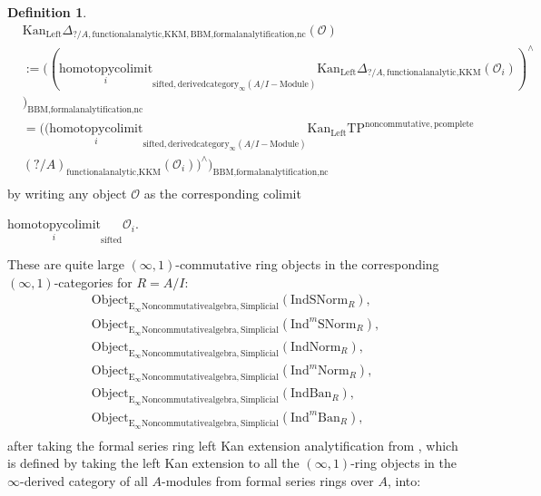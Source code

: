 \documentclass[11pt]{book}
\theoremstyle{definition}
\newtheorem{definition}[theorem]{Definition}
\numberwithin{equation}{section}
\begin{document}
\begin{definition}
\begin{align}
&\mathrm{Kan}_{\mathrm{Left}}\Delta_{?/A,\text{functionalanalytic,KKM},\text{BBM,formalanalytification,nc}}(\mathcal{O})\\
&:=	((\underset{i}{\text{homotopycolimit}}_{\text{sifted},\text{derivedcategory}_{\infty}(A/I-\text{Module})}\mathrm{Kan}_{\mathrm{Left}}\Delta_{?/A,\text{functionalanalytic,KKM}}(\mathcal{O}_i))^\wedge\\
&)_\text{BBM,formalanalytification,nc}\\
&=((\underset{i}{\text{homotopycolimit}}_{\text{sifted},\text{derivedcategory}_{\infty}(A/I-\text{Module})}\mathrm{Kan}_{\mathrm{Left}}\mathrm{TP}^\mathrm{noncommutative,pcomplete}\\
&(?/A)_{\text{functionalanalytic,KKM}}(\mathcal{O}_i))^\wedge)_\text{BBM,formalanalytification,nc}\\
\end{align}
by writing any object $\mathcal{O}$ as the corresponding colimit 
\begin{center}
$\underset{i}{\text{homotopycolimit}}_\text{sifted}\mathcal{O}_i$.
\end{center}
These are quite large $(\infty,1)$-commutative ring objects in the corresponding $(\infty,1)$-categories for $R=A/I$:
\begin{align}
\mathrm{Object}_{\mathrm{E}_\infty\mathrm{Noncommutativealgebra},\mathrm{Simplicial}}(\mathrm{IndSNorm}_R),\\
\mathrm{Object}_{\mathrm{E}_\infty\mathrm{Noncommutativealgebra},\mathrm{Simplicial}}(\mathrm{Ind}^m\mathrm{SNorm}_R),\\
\mathrm{Object}_{\mathrm{E}_\infty\mathrm{Noncommutativealgebra},\mathrm{Simplicial}}(\mathrm{IndNorm}_R),\\
\mathrm{Object}_{\mathrm{E}_\infty\mathrm{Noncommutativealgebra},\mathrm{Simplicial}}(\mathrm{Ind}^m\mathrm{Norm}_R),\\
\mathrm{Object}_{\mathrm{E}_\infty\mathrm{Noncommutativealgebra},\mathrm{Simplicial}}(\mathrm{IndBan}_R),\\
\mathrm{Object}_{\mathrm{E}_\infty\mathrm{Noncommutativealgebra},\mathrm{Simplicial}}(\mathrm{Ind}^m\mathrm{Ban}_R),\\
\end{align}
after taking the formal series ring left Kan extension analytification from \cite[Section 4.2]{BBM}, which is defined by taking the left Kan extension to all the $(\infty,1)$-ring objects in the $\infty$-derived category of all $A$-modules from formal series rings over $A$, into:

\end{definition}
\end{document}
